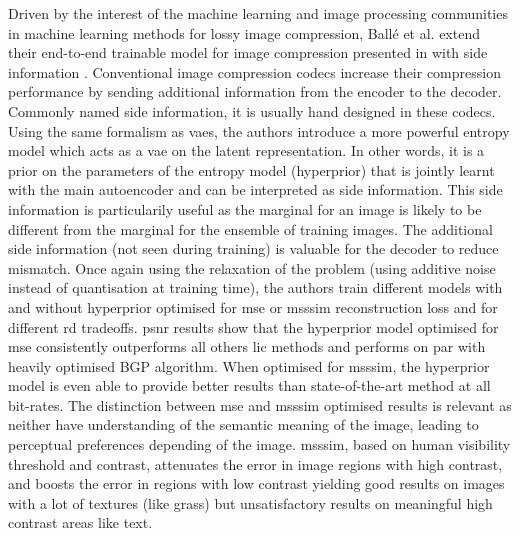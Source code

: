 Driven by the interest of the machine learning and image processing communities in machine learning methods for lossy image compression, Ballé et al. extend their end-to-end trainable model for image compression presented in \cite{ballé2017endtoendoptimizedimagecompression} with side information \cite{ballé2018variationalimagecompressionscale}. Conventional image compression codecs increase their compression performance by sending additional information from the encoder to the decoder. Commonly named side information, it is usually hand designed in these codecs. Using the same formalism as \acrshort{vae}s, the authors introduce a more powerful entropy model which acts as a \acrshort{vae} on the latent representation. In other words, it is a prior on the parameters of the entropy model (hyperprior) that is jointly learnt with the main autoencoder and can be interpreted as side information. This side information is particularily useful as the marginal for an image is likely to be different from the marginal for the ensemble of training images. The additional side information (not seen during training) is valuable for the decoder to reduce mismatch. Once again using the relaxation of the problem (using additive noise instead of quantisation at training time), the authors train different models with and without hyperprior optimised for \acrshort{mse} or \acrshort{msssim} reconstruction loss and for different \acrshort{rd} tradeoffs. \acrshort{psnr} results show that the hyperprior model optimised for \acrshort{mse} consistently outperforms all others \acrshort{lic} methods and performs on par with heavily optimised BGP algorithm. When optimised for \acrshort{msssim}, the hyperprior model is even able to provide better results than state-of-the-art method at all bit-rates. The distinction between \acrshort{mse} and \acrshort{msssim} optimised results is relevant as neither have understanding of the semantic meaning of the image, leading to perceptual preferences depending of the image. \acrshort{msssim}, based on human visibility threshold and contrast, attenuates the error in image regions with high contrast, and boosts the error in regions with low contrast yielding good results on images with a lot of textures (like grass) but unsatisfactory results on meaningful high contrast areas like text.

